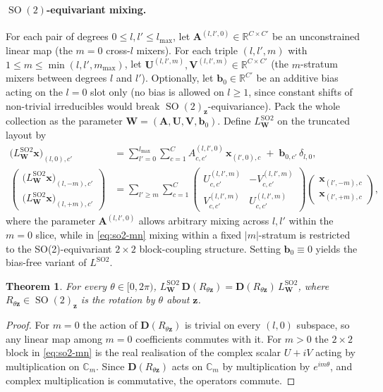 \documentclass[11pt,a4paper]{article}
\DeclareMathOperator{\SO}{SO}
\newcommand{\R}{\mathbb{R}}
\newcommand{\C}{\mathbb{C}}
\newcommand{\bA}{\bm{A}}
\newcommand{\bU}{\bm{U}}
\newcommand{\bV}{\bm{V}}
\newcommand{\bx}{\bm{x}}
\newcommand{\bz}{\bm{z}}
\newcommand{\bD}{\bm{D}}
\newcommand{\bW}{\bm{W}}
\newcommand{\lmax}{l_{\max}}
\newcommand{\mmax}{m_{\max}}
\theoremstyle{plain}
\newtheorem{theorem}{Theorem}
\theoremstyle{definition}
\theoremstyle{remark}
\begin{document}
    \paragraph{$\SO(2)$-equivariant mixing.}
    For each pair of degrees $0\le l,l'\le\lmax$, let $\bA^{(l,l',0)}\in\R^{C\times
    C'}$ be an unconstrained linear map (the $m=0$ cross-$l$ mixers). For each
    triple $(l,l',m)$ with $1\le m\le\min(l,l',\mmax)$, let
$\bU^{(l,l',m)},\bV^{(l,l',m)}\in\R^{C\times C'}$ (the $m$-stratum mixers
    between degrees $l$ and $l'$). Optionally, let $\bm{b}_0\in\R^{C'}$ be an
    additive bias acting on the $l=0$ slot only (no bias is allowed on $l\ge 1$,
    since constant shifts of non-trivial irreducibles would break
$\SO(2)_{\bz}$-equivariance). Pack the whole collection as the parameter
$\bW=(\bA,\bU,\bV,\bm{b}_0)$. Define $L^{\mathrm{SO2}}_{\bW}$ on the truncated
    layout by
    \begin{align}
        \bigl(L^{\mathrm{SO2}}_{\bW}\bx\bigr)_{(l,0),c'}
         & = \sum_{l'=0}^{\lmax}\sum_{c=1}^{C}A^{(l,l',0)}_{c,c'}\,\bx_{(l',0),c}\;+\;\bm{b}_{0,c'}\,\delta_{l,0},\label{eq:so2-m0} \\
        \begin{pmatrix}\bigl(L^{\mathrm{SO2}}_{\bW}\bx\bigr)_{(l,-m),c'} \\
            \bigl(L^{\mathrm{SO2}}_{\bW}\bx\bigr)_{(l,+m),c'}\end{pmatrix}
         & = \sum_{l'\geq m}\sum_{c=1}^{C}\begin{pmatrix} U^{(l,l',m)}_{c,c'} & -V^{(l,l',m)}_{c,c'} \\
                                                          V^{(l,l',m)}_{c,c'} & U^{(l,l',m)}_{c,c'}\end{pmatrix}
        \begin{pmatrix}\bx_{(l',-m),c}\\ \bx_{(l',+m),c}\end{pmatrix},\label{eq:so2-mn}
    \end{align}
    where the parameter $\bA^{(l,l',0)}$ allows arbitrary mixing across $l,l'$ within the $m=0$ slice, while in \eqref{eq:so2-mn} mixing within a fixed $|m|$-stratum is restricted to the SO(2)-equivariant $2\times 2$ block-coupling structure.
    Setting $\bm{b}_0\equiv 0$ yields the bias-free variant of $L^{\mathrm{SO2}}$.

    \begin{theorem}\label{thm:so2-eq}
    For every $\theta\in[0,2\pi)$, $L^{\mathrm{SO2}}_{\bW}\,\bD(R_{\theta\bz})=\bD(R_{\theta\bz})\,L^{\mathrm{SO2}}_{\bW}$, where $R_{\theta\bz}\in\SO(2)_{\bz}$ is the rotation by $\theta$ about $\bz$.
    \end{theorem}
    \begin{proof}
    For $m=0$ the action of $\bD(R_{\theta\bz})$ is trivial on every $(l,0)$ subspace, so any linear map among $m=0$ coefficients commutes with it.
    For $m>0$ the $2\times 2$ block in \eqref{eq:so2-mn} is the real realisation of the complex scalar $U+iV$ acting by multiplication on $\C_m$.
    Since $\bD(R_{\theta\bz})$ acts on $\C_m$ by multiplication by $e^{im\theta}$, and complex multiplication is commutative, the operators commute.
    \end{proof}
\end{document}
